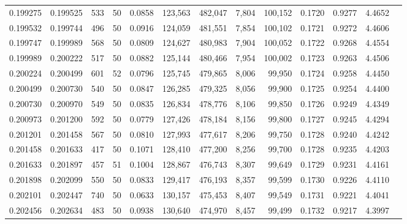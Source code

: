 \begin{tabular}{rrrrrrrrrrrrr}
0.199275 & 0.199525 &   533 &  50 &                                     0.0858 & 123,563 & 482,047 &   7,804 & 100,152 & 0.1720 & 0.9277 & 4.4652 \\
0.199532 & 0.199744 &   496 &  50 &                                     0.0916 & 124,059 & 481,551 &   7,854 & 100,102 & 0.1721 & 0.9272 & 4.4606 \\
0.199747 & 0.199989 &   568 &  50 &                                     0.0809 & 124,627 & 480,983 &   7,904 & 100,052 & 0.1722 & 0.9268 & 4.4554 \\
0.199989 & 0.200222 &   517 &  50 &                                     0.0882 & 125,144 & 480,466 &   7,954 & 100,002 & 0.1723 & 0.9263 & 4.4506 \\
0.200224 & 0.200499 &   601 &  52 &                                     0.0796 & 125,745 & 479,865 &   8,006 &  99,950 & 0.1724 & 0.9258 & 4.4450 \\
0.200499 & 0.200730 &   540 &  50 &                                     0.0847 & 126,285 & 479,325 &   8,056 &  99,900 & 0.1725 & 0.9254 & 4.4400 \\
0.200730 & 0.200970 &   549 &  50 &                                     0.0835 & 126,834 & 478,776 &   8,106 &  99,850 & 0.1726 & 0.9249 & 4.4349 \\
0.200973 & 0.201200 &   592 &  50 &                                     0.0779 & 127,426 & 478,184 &   8,156 &  99,800 & 0.1727 & 0.9245 & 4.4294 \\
0.201201 & 0.201458 &   567 &  50 &                                     0.0810 & 127,993 & 477,617 &   8,206 &  99,750 & 0.1728 & 0.9240 & 4.4242 \\
0.201458 & 0.201633 &   417 &  50 &                                     0.1071 & 128,410 & 477,200 &   8,256 &  99,700 & 0.1728 & 0.9235 & 4.4203 \\
0.201633 & 0.201897 &   457 &  51 &                                     0.1004 & 128,867 & 476,743 &   8,307 &  99,649 & 0.1729 & 0.9231 & 4.4161 \\
0.201898 & 0.202099 &   550 &  50 &                                     0.0833 & 129,417 & 476,193 &   8,357 &  99,599 & 0.1730 & 0.9226 & 4.4110 \\
0.202101 & 0.202447 &   740 &  50 &                                     0.0633 & 130,157 & 475,453 &   8,407 &  99,549 & 0.1731 & 0.9221 & 4.4041 \\
0.202456 & 0.202634 &   483 &  50 &                                     0.0938 & 130,640 & 474,970 &   8,457 &  99,499 & 0.1732 & 0.9217 & 4.3997 \\

\end{tabular}
